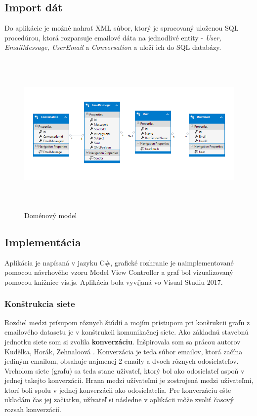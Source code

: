 \documentclass[slovak,master,public,dept460,male,cpdeclaration,oneside]{diploma}
\begin{document}
\subsection{Import dát}
Do aplikácie je možné nahrať XML súbor, ktorý je spracovaný uloženou SQL procedúrou, ktorá rozparsuje emailové dáta na jednodlivé entity - \textit{User, EmailMessage, UserEmail} a \textit{Conversation} a uloží ich do SQL databázy.


\begin{figure}[H]
\centering
\includegraphics[width=16cm, height=8cm]{figures/domain_model}
\caption{Doménový model}
\end{figure}

\subsection{Implementácia}
Aplikácia je napísaná v jazyku C\#, grafické rozhranie je naimplementované pomocou návrhového vzoru Model View Controller a graf bol vizualizovaný pomocou knižnice vis.js. Aplikácia bola vyvíjaná vo Visual Studiu 2017.

\subsubsection{Konštrukcia siete}
Rozdiel medzi prísupom rôznych štúdií a mojím prístupom pri konšrukcii grafu z emailového datasetu je v konštrukcii komunikačnej siete. Ako základnú stavebnú jednotku siete som si zvolila \textbf{konverzáciu}. Inšpirovala som sa prácou autorov Kudělka, Horák, Zehnaloová \cite{10}. Konverzácia je teda súbor emailov, ktorá začína jediným emailom, obsahuje najmenej 2 emaily a dvoch rôznych odosielateľov. Vrcholom siete (grafu) sa teda stane užívateľ, ktorý bol ako odosielateľ aspoň v jednej takejto konverzácii. Hrana medzi užívateľmi je zostrojená medzi užívateľmi, ktorí boli spolu v jednej konverzácii ako odosielatelia. Pre konverzáciu ešte ukladám čas jej začiatku, užívateľ si následne v aplikácii môže zvoliť časový rozsah konverzácií.
\end{document}
